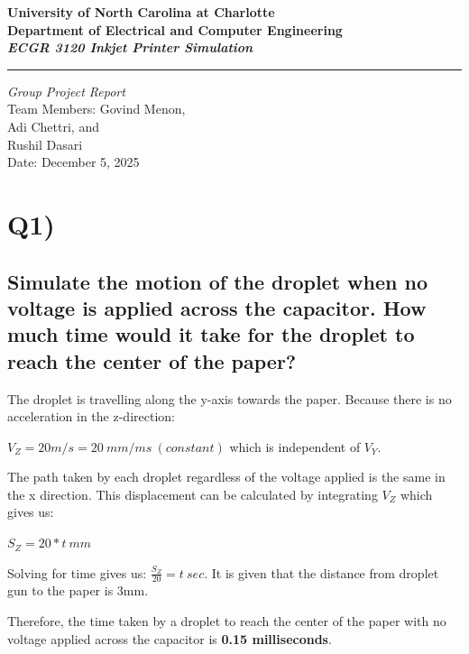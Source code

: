 \documentclass[a4paper]{article}
\begin{document}
\begin{titlepage}
    \thispagestyle{fancy} %
    \rhead{}
    \chead{}
    \rfoot{}
    \cfoot{}
    \lfoot{}
    \renewcommand{\headrulewidth}{0pt}
    \begin{center}
        \vspace*{2cm}


        \Large\textbf{University of North Carolina at Charlotte \\ [1pt]
        Department of Electrical and Computer Engineering \\ [2pt]
        \emph{ECGR 3120 Inkjet Printer Simulation} \\ [7pt]
        }

        \noindent\rule{15cm}{0.4pt}
        \vfill
        \vspace{3cm}
        \textit{Group Project Report} \\
        Team Members: Govind Menon,\\ Adi Chettri, and\\ Rushil Dasari \\
        Date: December 5, 2025 \\

        \vspace{1cm}

        \vfill
        \vfill
        \vfill

    \end{center}
\end{titlepage}

\section*{Q1)}
\subsection*{Simulate the motion of the droplet when no voltage is applied across the capacitor. How much time would it take for the droplet to reach the center of the paper?}\par

The droplet is travelling along the y-axis towards the paper. Because there is no acceleration in the z-direction:
\begin{center}
    $V_Z = 20m/s = 20\ mm/ms\ (constant)$ which is independent of $V_Y$.\\
\end{center}
The path taken by each droplet regardless of the voltage applied is the same in the x direction. This displacement can be calculated by integrating $V_Z$ which gives us:
\begin{center}
    $S_Z = 20*t\ mm$\\
\end{center} 
Solving for time gives us: $\frac{S_Z}{20} = t\ sec$. It is given that the distance from droplet gun to the paper is 3mm.\par
Therefore, the time taken by a droplet to reach the center of the paper with no voltage applied across the capacitor is \textbf{0.15 milliseconds}.
\end{document}
